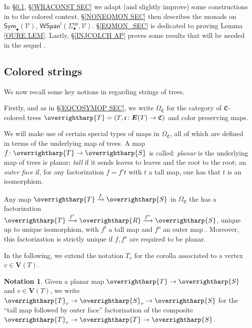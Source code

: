 \documentclass[a4paper,10pt
,draft
]{article}%
\numberwithin{equation}{section}
\numberwithin{figure}{section}
\theoremstyle{definition} %
\newtheorem{notation}[equation]{Notation}%
\newcommand{\vect}[1]{\text{\overrightharp{\ensuremath{#1}}}}
\newcommand{\V}{\ensuremath{\mathcal V}}
\newcommand{\1}{\ensuremath{\mathbbm 1}}%
\begin{document}
In \S \ref{CSTRINGS_SEC}, \S \ref{WRACONST SEC}
we adapt (and slightly improve) 
some constructions in \cite{BP_geo}
to the colored context.
%
\S \ref{NONEQMON SEC} then describes the monads on
$\mathsf{Sym}_{\bullet}(\V)$, $\mathsf{WSpan}^l(\Sigma_{\bullet}^{op},\mathcal{V})$.
%
\S \ref{EQMON_SEC} is dedicated to proving Lemma \ref{OURE LEM}.
Lastly,
\S \ref{INJCOLCH AP}
proves some results that 
will be needed in the sequel \cite{BP_ACOP}.





\subsection{Colored strings}
\label{CSTRINGS_SEC}


We now recall some key notions in \cite{BP_geo}
regarding strings of trees.

Firstly, and as in \S \ref{EQCOSYMOP SEC},
we write 
$\Omega_{\mathfrak{C}}$
for the category of 
$\mathfrak{C}$-colored trees
$\vect{T} = (T,\mathfrak{c}\colon \boldsymbol{E}(T) \to \mathfrak{C})$
and color preserving maps.

We will make use of certain special types of maps in $\Omega_{\mathfrak{C}}$, all of which are defined in terms of the underlying map of trees.
A map $f \colon \vect{T} \to \vect{S}$
is called:
\emph{planar} is the underlying map of trees is planar;
\emph{tall} if it sends leaves to leaves and the root to the root;
an \emph{outer face}
if, for any factorization 
$f = f' t$ with $t$ a tall map, one has that $t$ is an isomorphism. 

Any map $\vect{T} \xrightarrow{f} \vect{S}$ in $\Omega_{\mathfrak{C}}$
the has a factorization
$\vect{T} \xrightarrow{f^t} \vect{R} \xrightarrow{f^o} \vect{S}$,
unique up to unique isomorphism,
with $f^t$ a tall map and $f^o$ an outer map
\cite[Prop. 3.36]{BP_geo}.
Moreover, this factorization is strictly unique if $f,f^o$ are required to be planar.

In the following,
we extend the notation $T_v$ for the corolla associated to a vertex 
$v \in \boldsymbol{V}(T)$.


\begin{notation}\label{SVNOT NOT}
	Given a planar map $\vect{T} \to \vect{S}$
	and $v \in \boldsymbol{V}(T)$,
	we write
	$\vect{T}_v \to \vect{S}_v \to \vect{S}$
	for the ``tall map followed by outer face''
	factorization of the composite
	$\vect{T}_v \to \vect{T} \to \vect{S}$.
\end{notation}
\end{document}
